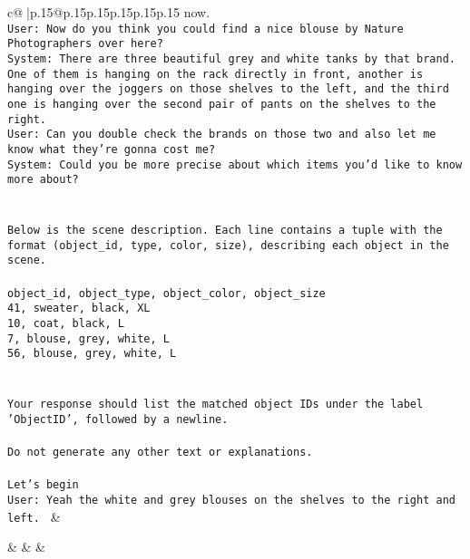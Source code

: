\documentclass{article}
\begin{document}
{\begin{supertabular}{c@{$\;$}|p{.15\linewidth}@{}p{.15\linewidth}p{.15\linewidth}p{.15\linewidth}p{.15\linewidth}p{.15\linewidth}}
{{{now.\\ \tt User: Now do you think you could find a nice blouse by Nature Photographers over here?\\ \tt System: There are three beautiful grey and white tanks by that brand. One of them is hanging on the rack directly in front, another is hanging over the joggers on those shelves to the left, and the third one is hanging over the second pair of pants on the shelves to the right.\\ \tt User: Can you double check the brands on those two and also let me know what they're gonna cost me?\\ \tt System: Could you be more precise about which items you'd like to know more about?\\ \tt \\ \tt \\ \tt Below is the scene description. Each line contains a tuple with the format (object_id, type, color, size), describing each object in the scene.\\ \tt \\ \tt object_id, object_type, object_color, object_size\\ \tt 41, sweater, black, XL\\ \tt 10, coat, black, L\\ \tt 7, blouse, grey, white, L\\ \tt 56, blouse, grey, white, L\\ \tt \\ \tt \\ \tt Your response should list the matched object IDs under the label 'ObjectID', followed by a newline.\\ \tt \\ \tt Do not generate any other text or explanations.\\ \tt \\ \tt Let's begin\\ \tt User: Yeah the white and grey blouses on the shelves to the right and left. 
	  } 
	   } 
	   } 
	 & \\ 
 

    \theutterance {}  

    &  
	 & & \\ 
 


\end{supertabular}}
\end{document}

